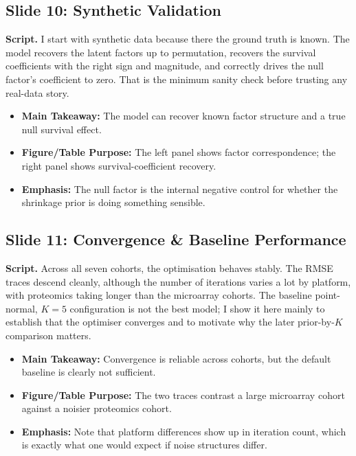 \documentclass[11pt]{article}
\newcommand{\sectionlabel}[1]{\textbf{#1}}
\begin{document}
\subsection*{Slide 10: Synthetic Validation}
\textbf{Script.} I start with synthetic data because there the ground truth is known. The model recovers the latent factors up to permutation, recovers the survival coefficients with the right sign and magnitude, and correctly drives the null factor’s coefficient to zero. That is the minimum sanity check before trusting any real-data story.

\begin{itemize}
\item \sectionlabel{Main Takeaway:} The model can recover known factor structure and a true null survival effect.
\item \sectionlabel{Figure/Table Purpose:} The left panel shows factor correspondence; the right panel shows survival-coefficient recovery.
\item \sectionlabel{Emphasis:} The null factor is the internal negative control for whether the shrinkage prior is doing something sensible.
\end{itemize}

\subsection*{Slide 11: Convergence \& Baseline Performance}
\textbf{Script.} Across all seven cohorts, the optimisation behaves stably. The RMSE traces descend cleanly, although the number of iterations varies a lot by platform, with proteomics taking longer than the microarray cohorts. The baseline point-normal, $K=5$ configuration is not the best model; I show it here mainly to establish that the optimiser converges and to motivate why the later prior-by-$K$ comparison matters.

\begin{itemize}
\item \sectionlabel{Main Takeaway:} Convergence is reliable across cohorts, but the default baseline is clearly not sufficient.
\item \sectionlabel{Figure/Table Purpose:} The two traces contrast a large microarray cohort against a noisier proteomics cohort.
\item \sectionlabel{Emphasis:} Note that platform differences show up in iteration count, which is exactly what one would expect if noise structures differ.
\end{itemize}
\end{document}
